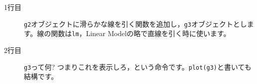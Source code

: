 \begin{description}
	\item[1行目] \texttt{g2}オブジェクトに滑らかな線を引く関数を追加し，\texttt{g3}オブジェクトとします。線の関数は\texttt{lm}，Linear Modelの略で直線を引く時に使います。
	\item[2行目] \texttt{g3}って何? つまりこれを表示しろ，という命令です。\texttt{plot(g3)}と書いても結構です。
\end{description}
